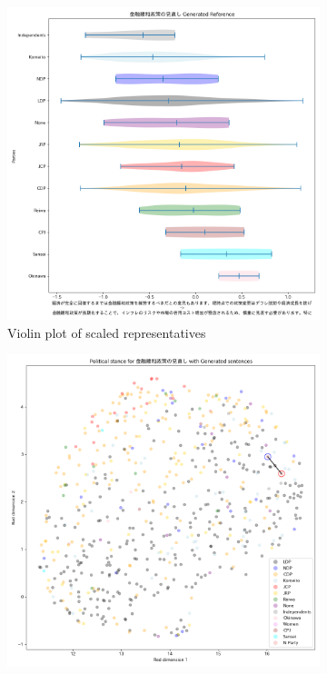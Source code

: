 \documentclass[final,5p,times,twocolumn,authoryear]{elsarticle}
\begin{document}
\begin{figure}[h]
\centering
    \begin{subfigure}{0.22\textwidth}
      \centering
      \includegraphics[width=1\linewidth]{figs/results/economy/fiscalpolicy_gen_violin_plot.png}
      \caption{Violin plot of scaled representatives}
    \end{subfigure}
    \begin{subfigure}{0.22\textwidth}
      \centering
      \includegraphics[width=1\linewidth]{figs/results/economy/fiscalpolicy_umap_gen.png}

\end{subfigure}
\end{figure}
\end{document}
